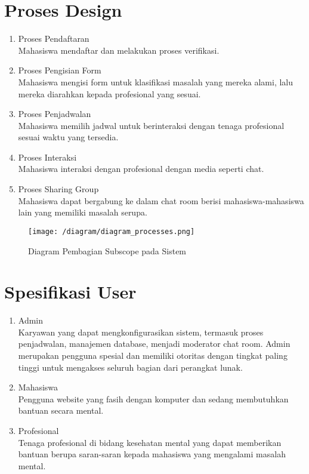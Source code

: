 \documentclass{article}
\begin{document}
	\section{Proses Design}
	\begin{enumerate}
		\item Proses Pendaftaran \\
		Mahasiswa mendaftar dan melakukan proses verifikasi.
		\item Proses Pengisian Form \\
		Mahasiswa mengisi form untuk  klasifikasi masalah yang mereka alami, lalu mereka diarahkan kepada profesional yang sesuai.
		\item Proses Penjadwalan \\
		Mahasiswa memilih jadwal untuk berinteraksi dengan tenaga profesional sesuai waktu yang tersedia.
		\item Proses Interaksi \\
		Mahasiswa interaksi dengan profesional dengan media seperti chat.
		\item Proses Sharing Group \\
		Mahasiswa dapat bergabung ke dalam chat room berisi mahasiswa-mahasiswa lain yang memiliki masalah serupa.
	\end{enumerate}
	
	\begin{figure}[H]
		\centering	
		\texttt{[image: /diagram/diagram\_processes.png]}
		\caption{Diagram Pembagian Subscope pada Sistem}
	\end{figure}
	\section{Spesifikasi User}
	\begin{enumerate}
		\item Admin \\
		Karyawan yang dapat mengkonfigurasikan sistem, termasuk proses penjadwalan, manajemen database, menjadi moderator chat room. Admin merupakan pengguna spesial dan memiliki otoritas dengan tingkat paling tinggi untuk mengakses seluruh bagian dari perangkat lunak.
		\item Mahasiswa \\
		Pengguna website yang fasih dengan komputer dan sedang membutuhkan bantuan secara mental.
		\item Profesional \\
		Tenaga profesional di bidang kesehatan mental yang dapat memberikan bantuan berupa saran-saran kepada mahasiswa yang mengalami masalah mental.
	\end{enumerate}
	
\end{document}
